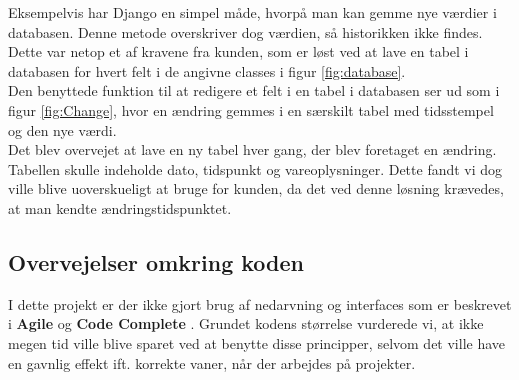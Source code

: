 \documentclass[]{article}
\begin{document}
\noindent Eksempelvis har Django en simpel måde, hvorpå man kan gemme nye værdier i databasen. Denne metode overskriver dog værdien, så historikken ikke findes. Dette var netop et af kravene fra kunden, som er løst ved at lave en tabel i databasen for hvert felt i de angivne classes i figur \ref{fig:database}. \\
Den benyttede funktion til at redigere et felt i en tabel i databasen ser ud som i figur \ref{fig:Change}, hvor en ændring gemmes i en særskilt tabel med tidsstempel og den nye værdi. \\
Det blev overvejet at lave en ny tabel hver gang, der blev foretaget en ændring. Tabellen skulle indeholde dato, tidspunkt og vareoplysninger. Dette fandt vi dog ville blive uoverskueligt at bruge for kunden, da det ved denne løsning krævedes, at man kendte ændringstidspunktet.

\subsection{Overvejelser omkring koden}
I dette projekt er der ikke gjort brug af nedarvning og interfaces som er beskrevet i \textbf{Agile} og \textbf{Code Complete} \cite{martin2006agile,mcconnell2004code}. Grundet kodens størrelse vurderede vi, at ikke megen tid ville blive sparet ved at benytte disse principper, selvom det ville have en gavnlig effekt ift. korrekte vaner, når der arbejdes på projekter.
\end{document}
